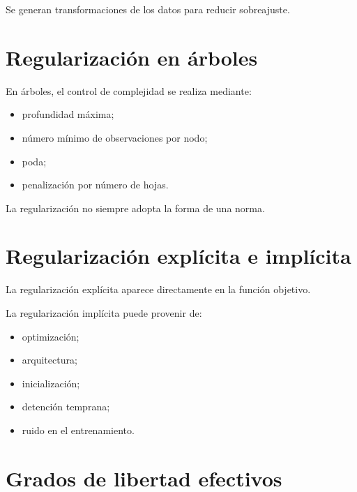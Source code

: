 \documentclass[
  spanish,
  10.5pt,
  letterpaper,
  DIV=11,
  numbers=noendperiod,
  oneside,
  open=any]{scrreprt}
\providecommand{\tightlist}{%
  \setlength{\itemsep}{0pt}\setlength{\parskip}{0pt}}
\theoremstyle{definition}
\theoremstyle{definition}
\theoremstyle{plain}
\theoremstyle{remark}
\begin{document}
Se generan transformaciones de los datos para reducir sobreajuste.

\section*{Regularización en
árboles}\label{regularizaciuxf3n-en-uxe1rboles}


En árboles, el control de complejidad se realiza mediante:

\begin{itemize}
\tightlist
\item
  profundidad máxima;
\item
  número mínimo de observaciones por nodo;
\item
  poda;
\item
  penalización por número de hojas.
\end{itemize}

La regularización no siempre adopta la forma de una norma.

\section*{Regularización explícita e
implícita}\label{regularizaciuxf3n-expluxedcita-e-impluxedcita}


La regularización explícita aparece directamente en la función objetivo.

La regularización implícita puede provenir de:

\begin{itemize}
\tightlist
\item
  optimización;
\item
  arquitectura;
\item
  inicialización;
\item
  detención temprana;
\item
  ruido en el entrenamiento.
\end{itemize}

\section*{Grados de libertad
efectivos}\label{grados-de-libertad-efectivos}
\end{document}
